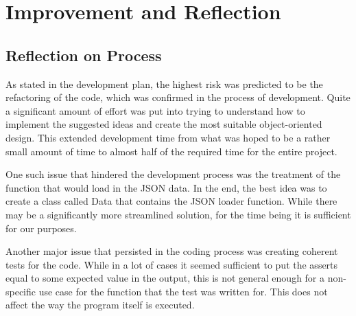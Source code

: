 \documentclass[12pt,a4paper,tightenlines]{article}
\begin{document}
\section{Improvement and Reflection}
\subsection{Reflection on Process}
As stated in the development plan, the highest risk was predicted to be
the refactoring of the code, which was confirmed in the process
of development. Quite a significant amount of effort was put into 
trying to understand how to implement the suggested ideas and create
the most suitable object-oriented design. This extended development time
from what was hoped to be a rather small amount of time to almost
half of the required time for the entire project.

One such issue that hindered
the development process was the treatment of the function that would load
in the JSON data. In the end, the best idea was to create a class called
Data that contains the JSON loader function. While there may be a 
significantly more streamlined solution, for the time being it is
sufficient for our purposes.

Another major issue that persisted in the coding process was creating
coherent tests for the code. While in a lot of cases it seemed sufficient
to put the asserts equal to some expected value in the output, this
is not general enough for a non-specific use case for the function
that the test was written for. This does not affect the way the 
program itself is executed.
\end{document}
